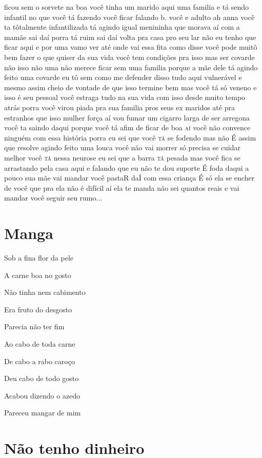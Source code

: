 {ficou sem o sorvete na boa você tinha um marido aqui uma familia e tá
sendo infantil no que você tá fazendo você ficar falando b. você e
adulto ah anna você ta tôtalmente infantilizada tá agindo igual
menininha que morava aí com a mamãe sai daí porra tá ruim sai daí volta
pra casa pro seu lar não eu tenho que ficar aqui e por uma vamo ver até
onde vai essa fita como disse você pode muitô bem fazer o que quiser da
sua vida você tem condições pra isso mas ser covarde não isso não uma
não merece ficar sem uma familia porque a mãe dele tá agindo feito uma
covarde eu tô sem como me defender disso tudo aqui vulnerável e mesmo
assim cheio de vontade de que isso termine bem mas você tá só veneno e
isso é seu pessoal você estraga tudo na sua vida com isso desde muito
tempo atrás porra você virou piada pra sua familia pros seus ex maridos
até pra estranhos que isso mulher força aí vou fumar um cigarro larga de
ser arregona} você ta saindo daqui porque você tá afim de ficar de boa \textsc{aí}
você não convence ninguém com essa história porra eu sei que você \textsc{tá} se
fodendo mas não É assim que resolve agindo feito uma louca você não vai
morrer só precisa se cuidar melhor você \textsc{tá} nessa neurose eu sei que a
barra \textsc{tá} pesada mas você fica se arrastando pela casa aqui e falando que
eu não te dou suporte É foda daqui a pouco sua mãe vai mandar você
pastaR daÍ com essa criança É só ela se encher de você que pra ela não é
difícil aí ela te manda não sei quantos reais e vai mandar você seguir
seu rumo...

\chapter{Manga}

Sob a fina flor da pele

A carne boa no gosto

Não tinha nem cabimento

Era fruto do desgosto

Parecia não ter fim

Ao cabo de toda carne

De cabo a rabo caroço

Deu cabo de todo gosto

Acabou dizendo o azedo

Pareceu mangar de mim

\chapter{Não tenho dinheiro}

